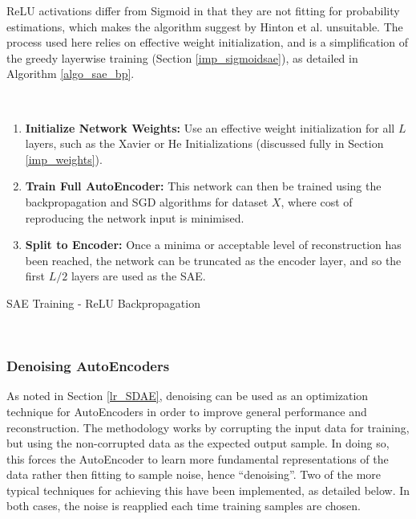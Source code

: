 \documentclass[a4paper,11pt,oneside]{article}
\theoremstyle{plain}
\theoremstyle{definition}
\begin{document}
	ReLU activations differ from Sigmoid in that they are not fitting for probability estimations, which makes the algorithm suggest by Hinton et al. unsuitable. The process used here relies on effective weight initialization, and is a simplification of the greedy layerwise training (Section \ref{imp_sigmoidsae}), as detailed in Algorithm \ref{algo_sae_bp}. \newline 
	
	\begin{algorithm}[H]
		\texttt{\\}
		
	\begin{enumerate}
		\item \textbf{Initialize Network Weights:} Use an effective weight initialization for all $L$ layers, such as the Xavier or He Initializations (discussed fully in Section \ref{imp_weights}).
		\item  \textbf{Train Full AutoEncoder:} This network can then be trained using the backpropagation and SGD algorithms for dataset $X$, where cost of reproducing the network input is minimised.
		\item \textbf{Split to Encoder:} Once a minima or acceptable level of reconstruction has been reached, the network can be truncated as the encoder layer, and so the first $L/2$ layers are used as the SAE.
	\end{enumerate}
		
		\label{algo_sae_bp}
		\caption{SAE Training - ReLU Backpropagation}
	\end{algorithm}
	~\\
	
	\subsubsection{Denoising AutoEncoders}\label{imp_denoising}
	
	As noted in Section \ref{lr_SDAE}, denoising can be used as an optimization technique for AutoEncoders in order to improve general performance and reconstruction. The methodology works by corrupting the input data for training, but using the non-corrupted data as the expected output sample. In doing so, this forces the AutoEncoder to learn more fundamental representations of the data rather then fitting to sample noise, hence ``denoising''. Two of the more typical techniques for achieving this have been implemented, as detailed below. In both cases, the noise is reapplied each time training samples are chosen.
	
\end{document}
